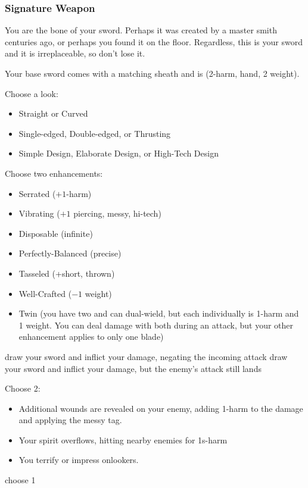 \subsubsection{Signature Weapon}\label{sec:Signature Weapon}
You are the bone of your sword. Perhaps it was created by a master smith centuries ago, or perhaps you found it on the floor. Regardless, this is your sword and it is irreplaceable, so don't lose it.

Your base sword comes with a matching sheath and is (2-harm, hand, 2 weight).

Choose a look:
\begin{itemize}
\item Straight or Curved
\item Single-edged, Double-edged, or Thrusting
\item Simple Design, Elaborate Design, or High-Tech Design
\end{itemize}

Choose two enhancements:
\begin{itemize}
\item Serrated ($+1$-harm)
\item Vibrating ($+1$ piercing, messy, hi-tech)
\item Disposable (infinite)
\item Perfectly-Balanced (precise)
\item Tasseled (+short, thrown)
\item Well-Crafted ($-1$ weight)
\item Twin (you have two and can dual-wield, but each individually is 1-harm and 1 weight. You can deal damage with both during an attack, but your other enhancement applies to only one blade)
\end{itemize}

{draw your sword and inflict your damage, negating the incoming attack}
{draw your sword and inflict your damage, but the enemy's attack still lands}

{Choose 2:
\begin{itemize}
\item Additional wounds are revealed on your enemy, adding 1-harm to the damage and applying the messy tag.
\item Your spirit overflows, hitting nearby enemies for 1s-harm
\item You terrify or impress onlookers.
\end{itemize}}
{choose 1}

